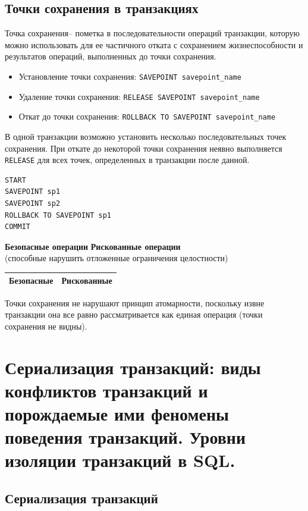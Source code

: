 \documentclass[a4paper,12pt]{article}
\begin{document}
\subsection{Точки сохранения в транзакциях}

Точка сохранения– пометка в последовательности операций транзакции, которую можно использовать для ее частичного отката с сохранением жизнеспособности и результатов операций, выполненных до точки сохранения.

\begin{itemize}
    \item Установление точки сохранения: \texttt{SAVEPOINT savepoint\_name}
    \item Удаление точки сохранения: \texttt{RELEASE SAVEPOINT savepoint\_name}
    \item Откат до точки сохранения: \texttt{ROLLBACK TO SAVEPOINT savepoint\_name}
\end{itemize}

В одной транзакции возможно установить несколько последовательных точек сохранения. При откате до некоторой точки сохранения неявно выполняется \texttt{RELEASE} для всех точек, определенных в транзакции после данной.

\begin{lstlisting}
START
SAVEPOINT sp1
SAVEPOINT sp2
ROLLBACK TO SAVEPOINT sp1
COMMIT
\end{lstlisting}

\textbf{Безопасные операции} \hfill \textbf{Рискованные операции} \\
(способные нарушить отложенные ограничения целостности) \\
\begin{tabular}{|c|c|}
    \hline
    \textbf{Безопасные} & \textbf{Рискованные} \\
    \hline
    \end{tabular}

Точки сохранения не нарушают принцип атомарности, поскольку извне транзакции она все равно рассматривается как единая операция (точки сохранения не видны).



\section{Сериализация транзакций: виды конфликтов транзакций и порождаемые ими феномены поведения транзакций. Уровни изоляции транзакций в SQL.}

\subsection{Сериализация транзакций}
\end{document}
